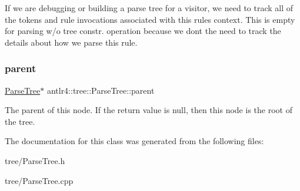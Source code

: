 If we are debugging or building a parse tree for a visitor, we need to track all of the tokens and rule invocations associated with this rule\textquotesingle{}s context. This is empty for parsing w/o tree constr. operation because we don\textquotesingle{}t the need to track the details about how we parse this rule. \mbox{\label{classantlr4_1_1tree_1_1ParseTree_a83402632670316b68280c04e6be70d50}} 
\subsubsection{\texorpdfstring{parent}{parent}}
{\footnotesize\ttfamily \hyperlink{classantlr4_1_1tree_1_1ParseTree}{Parse\+Tree}$\ast$ antlr4\+::tree\+::\+Parse\+Tree\+::parent}

The parent of this node. If the return value is null, then this node is the root of the tree. 

The documentation for this class was generated from the following files\+:\begin{DoxyCompactItemize}
\item 
tree/Parse\+Tree.\+h\item 
tree/Parse\+Tree.\+cpp\end{DoxyCompactItemize}
